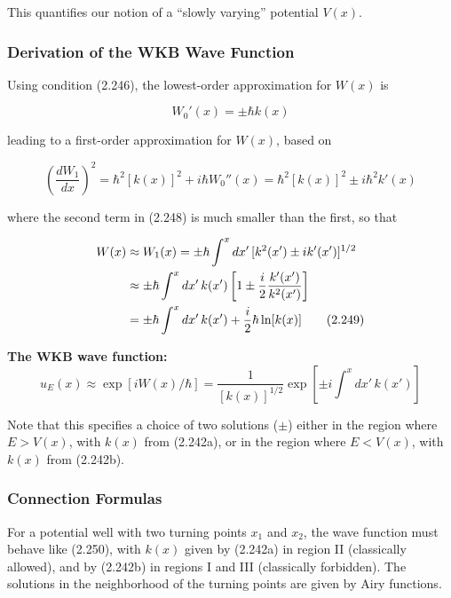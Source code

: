\documentclass[11pt,a4paper]{article}
\begin{document}
This quantifies our notion of a ``slowly varying'' potential $V(x)$.

\subsubsection{Derivation of the WKB Wave Function}

Using condition (2.246), the lowest-order approximation for $W(x)$ is

\begin{equation}
W_0'(x) = \pm\hbar k(x)
\tag{2.247}
\end{equation}

leading to a first-order approximation for $W(x)$, based on

\begin{equation}
\left(\frac{dW_1}{dx}\right)^2 = \hbar^2[k(x)]^2 + i\hbar W_0''(x) = \hbar^2[k(x)]^2 \pm i\hbar^2 k'(x)
\tag{2.248}
\end{equation}

where the second term in (2.248) is much smaller than the first, so that

\begin{align}
W(x) &\approx W_1(x) = \pm\hbar\int^x dx'\,[k^2(x') \pm ik'(x')]^{1/2} \notag \\
&\approx \pm\hbar\int^x dx'\,k(x')\left[1 \pm \frac{i}{2}\frac{k'(x')}{k^2(x')}\right] \notag \\
&= \pm\hbar\int^x dx'\,k(x') + \frac{i}{2}\hbar\ln[k(x)]
\tag{2.249}
\end{align}

\textbf{The WKB wave function:}
\begin{equation}
\boxed{u_E(x) \approx \exp[iW(x)/\hbar] = \frac{1}{[k(x)]^{1/2}}\exp\left[\pm i\int^x dx'\,k(x')\right]}
\tag{2.250}
\end{equation}

Note that this specifies a choice of two solutions ($\pm$) either in the region where $E > V(x)$, with $k(x)$ from (2.242a), or in the region where $E < V(x)$, with $k(x)$ from (2.242b).

\subsubsection{Connection Formulas}

For a potential well with two turning points $x_1$ and $x_2$, the wave function must behave like (2.250), with $k(x)$ given by (2.242a) in region II (classically allowed), and by (2.242b) in regions I and III (classically forbidden). The solutions in the neighborhood of the turning points are given by Airy functions.
\end{document}
